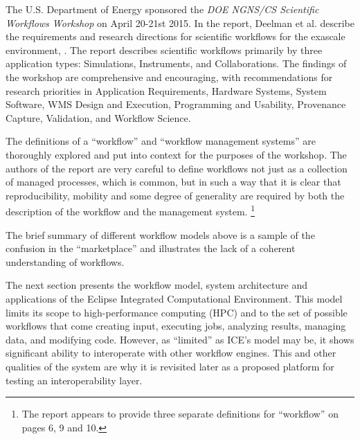 The U.S. Department of Energy sponsored the \emph{DOE NGNS/CS Scientific
Workflows Workshop} on April 20-21st 2015. In the report, Deelman et al.
describe the requirements and research directions for scientific
workflows for the exascale environment, \cite{deelman_future_2015}. The report
describes scientific workflows primarily by three application types:
Simulations, Instruments, and Collaborations. The findings of the workshop are
comprehensive and encouraging, with recommendations for research
priorities in Application Requirements, Hardware Systems, System
Software, WMS Design and Execution, Programming and Usability,
Provenance Capture, Validation, and Workflow Science.

The definitions of a ``workflow'' and ``workflow management systems''
are thoroughly explored and put into context for the purposes of the
workshop. The authors of the report are very careful to define workflows
not just as a collection of managed processes, which is common, but in
such a way that it is clear that reproducibility, mobility and some
degree of generality are required by both the description of the
workflow and the management system. \footnote{The report appears to provide
three separate definitions for ``workflow'' on pages 6, 9 and 10.}

The brief summary of different workflow models above is a sample of the
confusion in the ``marketplace'' and illustrates the lack of a coherent
understanding of workflows.

The next section presents the workflow model, system architecture and
applications of the Eclipse Integrated Computational Environment. This
model limits its scope to high-performance computing (HPC) and to the
set of possible workflows that come creating input, executing jobs,
analyzing results, managing data, and modifying code. However, as ``limited'' as
ICE's model may be, it shows significant ability to interoperate with
other workflow engines. This and other qualities of the system are why
it is revisited later as a proposed platform for testing an
interoperability layer.

